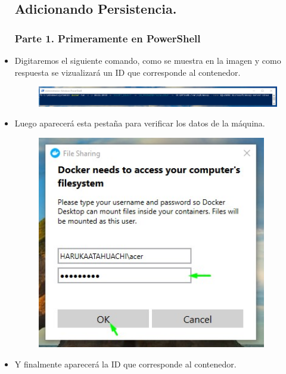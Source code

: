 \begin{itemize}
			\subsection{Adicionando Persistencia.}
				\subsubsection{Parte 1. Primeramente en PowerShell}
					\item Digitaremos el siguiente comando, como se muestra en la imagen y como respuesta se vizualizará un ID que corresponde al contenedor.
						\begin{figure}[htb]
							\begin{center}
								\includegraphics[width=19cm]{./Imagenes/Comando09}
							\end{center}
						\end{figure}
					\item Luego aparecerá esta pestaña para verificar los datos de la máquina.
						\begin{figure}[htb]
							\begin{center}
								\includegraphics[width=10cm]{./Imagenes/Access02}
							\end{center}
						\end{figure}
					\item Y finalmente aparecerá la ID que corresponde al contenedor.
						\begin{figure}[htb]
							\begin{center}

\end{center}
\end{figure}
\end{itemize}
